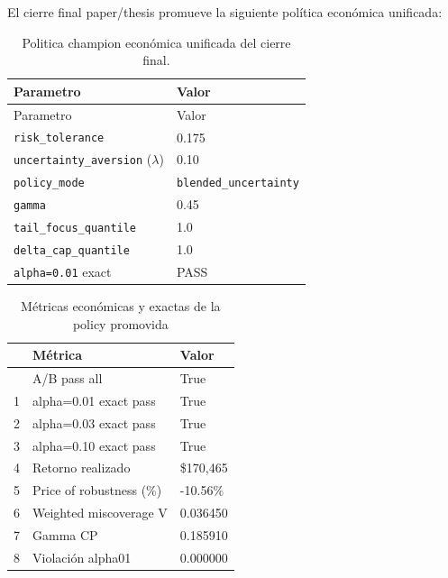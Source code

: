 \documentclass[
  spanish,
  11pt,
  letterpaper,
]{scrbook}
\theoremstyle{plain}
\theoremstyle{remark}
\begin{document}
El cierre final paper/thesis promueve la siguiente política económica
unificada:

\begin{longtable}[]{@{}ll@{}}
\caption{Politica champion económica unificada del cierre
final.}\label{tbl-champion-policy}\tabularnewline
\toprule\noalign{}
Parametro & Valor \\
\midrule\noalign{}
\endfirsthead
\toprule\noalign{}
Parametro & Valor \\
\midrule\noalign{}
\endhead
\bottomrule\noalign{}
\endlastfoot
\texttt{risk\_tolerance} & 0.175 \\
\texttt{uncertainty\_aversion} (\(\lambda\)) & 0.10 \\
\texttt{policy\_mode} & \texttt{blended\_uncertainty} \\
\texttt{gamma} & 0.45 \\
\texttt{tail\_focus\_quantile} & 1.0 \\
\texttt{delta\_cap\_quantile} & 1.0 \\
\texttt{alpha=0.01} exact & PASS \\
\end{longtable}

{

\begin{longtable}[]{@{}lll@{}}

\caption{\label{tbl-champion-policy-metrics}Métricas económicas y
exactas de la policy promovida}

\tabularnewline

\toprule\noalign{}
& Métrica & Valor \\
\midrule\noalign{}
\endhead
\bottomrule\noalign{}
\endlastfoot
0 & A/B pass all & True \\
1 & alpha=0.01 exact pass & True \\
2 & alpha=0.03 exact pass & True \\
3 & alpha=0.10 exact pass & True \\
4 & Retorno realizado & \$170,465 \\
5 & Price of robustness (\%) & -10.56\% \\
6 & Weighted miscoverage V & 0.036450 \\
7 & Gamma CP & 0.185910 \\
8 & Violación alpha01 & 0.000000 \\

\end{longtable}

}
\end{document}
